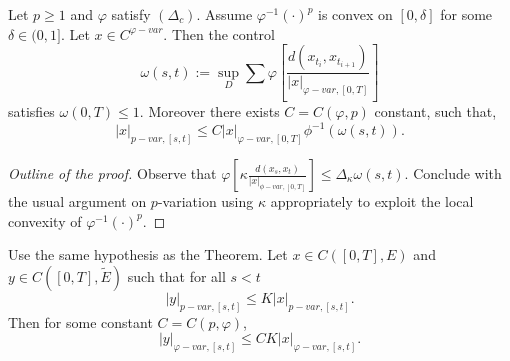 \begin{theorem}
    Let $p \ge 1$ and $\varphi$ satisfy $(\Delta_c)$. Assume $\varphi^{-1}(\cdot)^p$ is convex on $[0,\delta]$ for some $\delta \in (0,1].$
    Let $x \in C^{\varphi-var}.$
    Then the control
    \begin{equation}
        \omega(s,t) := \sup_D \sum \varphi \left[ \frac{d(x_{t_i}, x_{t_{i+1}})}{|x|_{\varphi-var,[0,T]}} \right]
    \end{equation}
    satisfies $\omega(0,T) \le 1$. Moreover there exists $C = C(\varphi, p)$ constant, such that,
    \begin{equation}
        |x|_{p-var, [s,t]} \le C |x|_{\varphi-var,[0,T]} \phi^{-1}(\omega(s,t)).
    \end{equation}
\end{theorem}
\begin{proof}[Outline of the proof]
    Observe that $\varphi \left[ \kappa \frac{d(x_s, x_t)}{|x|_{\phi-var,[0,T]}} \right] \leq \Delta_\kappa \omega(s,t).$
    Conclude with the usual argument on $p$-variation using $\kappa$ appropriately to exploit the local convexity of $\varphi^{-1}(\cdot)^p$. 
\end{proof}

\begin{corollary}
    Use the same hypothesis as the Theorem. Let $x \in C([0,T],E)$ and $y \in C([0,T],\tilde{E})$ such that for all $s < t$
    \begin{equation}
        |y|_{p-var,[s,t]} \le K |x|_{p-var,[s,t]}.
    \end{equation}
    Then for some constant $C = C(p,\varphi)$,
    \begin{equation}
        |y|_{\varphi-var,[s,t]} \le C K |x|_{\varphi-var,[s,t]}.
    \end{equation}
\end{corollary}